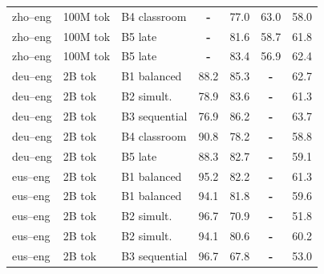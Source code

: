 \begin{table}[t]
\begin{tabular}{lll cc cc}
zho--eng  & 100M tok & B4 classroom & \textbf{-} & \cellcolor[rgb]{0.853,1.000,0.853} 77.0 & \cellcolor[rgb]{0.908,1.000,0.908} 63.0 & \cellcolor[rgb]{0.934,1.000,0.934} 58.0 \\
zho--eng & 100M tok & B5 late & \textbf{-} & \cellcolor[rgb]{0.828,1.000,0.828} 81.6 & \cellcolor[rgb]{0.938,1.000,0.938} 58.7 & \cellcolor[rgb]{0.903,1.000,0.903} 61.8 \\
zho--eng  & 100M tok & B5 late & \textbf{-} & \cellcolor[rgb]{0.818,1.000,0.818} 83.4 & \cellcolor[rgb]{0.951,1.000,0.951} 56.9 & \cellcolor[rgb]{0.898,1.000,0.898} 62.4 \\
\midrule
deu--eng & 2B tok & B1 balanced & \cellcolor[rgb]{0.789,1.000,0.789} 88.2 & \cellcolor[rgb]{0.807,1.000,0.807} 85.3 & \textbf{-} & \cellcolor[rgb]{0.895,1.000,0.895} 62.7 \\
deu--eng & 2B tok & B2 simult. & \cellcolor[rgb]{0.840,1.000,0.840} 78.9 & \cellcolor[rgb]{0.817,1.000,0.817} 83.6 & \textbf{-} & \cellcolor[rgb]{0.907,1.000,0.907} 61.3 \\
deu--eng & 2B tok & B3 sequential & \cellcolor[rgb]{0.851,1.000,0.851} 76.9 & \cellcolor[rgb]{0.803,1.000,0.803} 86.2 & \textbf{-} & \cellcolor[rgb]{0.887,1.000,0.887} 63.7 \\
deu--eng & 2B tok & B4 classroom & \cellcolor[rgb]{0.774,1.000,0.774} 90.8 & \cellcolor[rgb]{0.846,1.000,0.846} 78.2 & \textbf{-} & \cellcolor[rgb]{0.928,1.000,0.928} 58.8 \\
deu--eng & 2B tok & B5 late & \cellcolor[rgb]{0.788,1.000,0.788} 88.3 & \cellcolor[rgb]{0.822,1.000,0.822} 82.7 & \textbf{-} & \cellcolor[rgb]{0.925,1.000,0.925} 59.1 \\
eus--eng & 2B tok & B1 balanced & \cellcolor[rgb]{0.750,1.000,0.750} 95.2 & \cellcolor[rgb]{0.824,1.000,0.824} 82.2 & \textbf{-} & \cellcolor[rgb]{0.907,1.000,0.907} 61.3 \\
eus--eng  & 2B tok & B1 balanced & \cellcolor[rgb]{0.756,1.000,0.756} 94.1 & \cellcolor[rgb]{0.827,1.000,0.827} 81.8 & \textbf{-} & \cellcolor[rgb]{0.921,1.000,0.921} 59.6 \\
eus--eng & 2B tok & B2 simult. & \cellcolor[rgb]{0.742,1.000,0.742} 96.7 & \cellcolor[rgb]{0.886,1.000,0.886} 70.9 & \textbf{-} & \cellcolor[rgb]{0.985,1.000,0.985} 51.8 \\
eus--eng  & 2B tok & B2 simult. & \cellcolor[rgb]{0.756,1.000,0.756} 94.1 & \cellcolor[rgb]{0.833,1.000,0.833} 80.6 & \textbf{-} & \cellcolor[rgb]{0.916,1.000,0.916} 60.2 \\
eus--eng & 2B tok & B3 sequential & \cellcolor[rgb]{0.742,1.000,0.742} 96.7 & \cellcolor[rgb]{0.903,1.000,0.903} 67.8 & \textbf{-} & \cellcolor[rgb]{0.975,1.000,0.975} 53.0 \\

\end{tabular}
\end{table}
